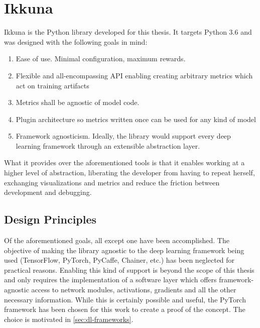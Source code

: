 \hypertarget{ikkuna}{%
\chapter{Ikkuna}\label{ikkuna}}

Ikkuna is the Python library developed for this thesis. It targets
Python 3.6 and was designed with the following goals in mind:

\begin{enumerate}
    \item
        Ease of use. Minimal configuration, maximum rewards.
    \item
        Flexible and all-encompassing API enabling creating arbitrary metrics
        which act on training artifacts
    \item
        Metrics shall be agnostic of model code.
    \item
        Plugin architecture so metrics written once can be used for any kind
        of model
    \item
        Framework agnosticism. Ideally, the library would support every deep
        learning framework through an extensible abstraction layer.
\end{enumerate}

What it provides over the aforementioned tools is that it enables
working at a higher level of abstraction, liberating the developer from
having to repeat herself, exchanging visualizations and metrics and
reduce the friction between development and debugging.

\hypertarget{design-principles}{%
\section{Design Principles}\label{design-principles}}

Of the aforementioned goals, all except one have been accomplished. The
objective of making the library agnostic to the deep learning framework
being used (TensorFlow, PyTorch, PyCaffe, Chainer, etc.) has been
neglected for practical reasons. Enabling this kind of support is beyond
the scope of this thesis and only requires the implementation of a
software layer which offers framework-agnostic access to network
modules, activations, gradients and all the other necessary information.
While this is certainly possible and useful, the PyTorch framework has
been chosen for this work to create a proof of the concept. The choice is
motivated in \cref{sec:dl-frameworks}.

